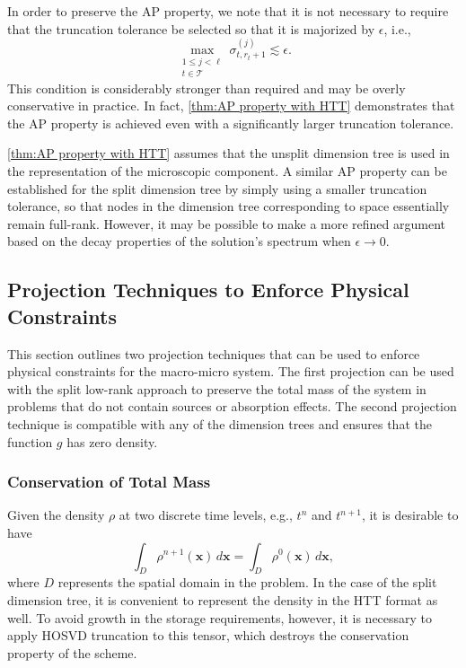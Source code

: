 \documentclass[onefignum,onetabnum]{siamart220329}
\begin{document}
\begin{remark}
    In order to preserve the AP property, we note that it is not necessary to require that the truncation tolerance be selected so that it is majorized by $\epsilon$, i.e.,
    \begin{equation*}
        \max_{\substack{1 \leq j < \ell \\ t \in \mathcal{T}}} \sigma_{t,r_{t}+1}^{(j)} \lesssim \epsilon.
    \end{equation*}
    This condition is considerably stronger than required and may be overly conservative in practice. In fact, \cref{thm:AP property with HTT} demonstrates that the AP property is achieved even with a significantly larger truncation tolerance.
\end{remark}
\begin{remark}
    \cref{thm:AP property with HTT} assumes that the unsplit dimension tree is used in the representation of the microscopic component. A similar AP property can be established for the split dimension tree by simply using a smaller truncation tolerance, so that nodes in the dimension tree corresponding to space essentially remain full-rank. However, it may be possible to make a more refined argument based on the decay properties of the solution's spectrum when $\epsilon \rightarrow 0$.
\end{remark}




\subsection{Projection Techniques to Enforce Physical Constraints}

This section outlines two projection techniques that can be used to enforce physical constraints for the macro-micro system. The first projection can be used with the split low-rank approach to preserve the total mass of the system in problems that do not contain sources or absorption effects. The second projection technique is compatible with any of the dimension trees and ensures that the function $g$ has zero density.

\subsubsection{Conservation of Total Mass}
\label{subsubsec:mass projection}

Given the density $\rho$ at two discrete time levels, e.g., $t^{n}$ and $t^{n+1}$, it is desirable to have
\begin{equation}
    \label{eq:mass conservation property}
    \int_{D} \rho^{n+1}(\mathbf{x}) \, d\mathbf{x} = \int_{D} \rho^{0}(\mathbf{x}) \, d\mathbf{x},
\end{equation}
where $D$ represents the spatial domain in the problem. In the case of the split dimension tree, it is convenient to represent the density in the HTT format as well. To avoid growth in the storage requirements, however, it is necessary to apply HOSVD truncation to this tensor, which destroys the conservation property of the scheme. 
\end{document}
